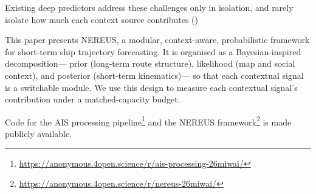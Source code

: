 \documentclass[runningheads]{preamp/llncs}
\begin{document}
Existing deep predictors address these challenges only in isolation, and rarely isolate how much each context source contributes ()
%
%

This paper presents \ac{NEREUS}, a
modular,
context-aware,
probabilistic framework
for short-term ship trajectory forecasting.
%
It is organised as a Bayesian-inspired decomposition---%
prior (long-term route structure),
likelihood (map and social context),
and
posterior (short-term kinematics)---%
so that each contextual signal is a switchable module.
%
We use this design to measure each contextual signal's contribution
under a matched-capacity budget.


Code for the \ac{AIS} processing pipeline\footnote{\url{https://anonymous.4open.science/r/ais-processing-26miwai/}}
and
the \ac{NEREUS} framework\footnote{\url{https://anonymous.4open.science/r/nereus-26miwai/}}
is made publicly available.
\end{document}
